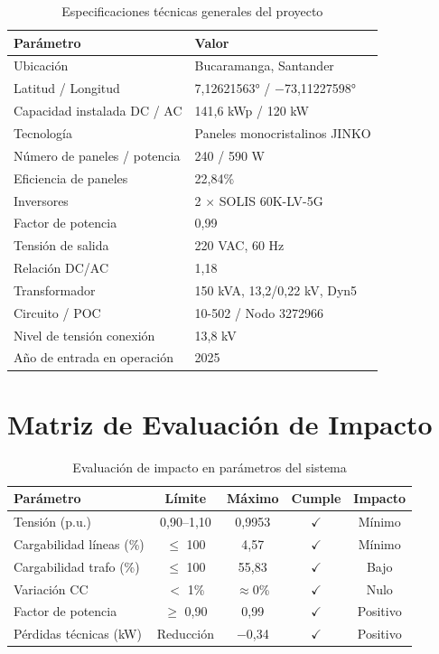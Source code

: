 \begin{table}[H]
    \centering
    \caption{Especificaciones técnicas generales del proyecto}
    \begin{tabular}{ll}
    \toprule
    \textbf{Parámetro} & \textbf{Valor} \\
    \midrule
    Ubicación & Bucaramanga, Santander \\
    Latitud / Longitud & 7,12621563° / $-$73,11227598° \\
    Capacidad instalada DC / AC & 141,6 kWp / 120 kW \\
    Tecnología & Paneles monocristalinos JINKO \\
    Número de paneles / potencia & 240 / 590 W \\
    Eficiencia de paneles & 22,84\% \\
    Inversores & 2 $\times$ SOLIS 60K-LV-5G \\
    Factor de potencia & 0,99 \\
    Tensión de salida & 220 VAC, 60 Hz \\
    Relación DC/AC & 1,18 \\
    Transformador & 150 kVA, 13,2/0,22 kV, Dyn5 \\
    Circuito / POC & 10-502 / Nodo 3272966 \\
    Nivel de tensión conexión & 13,8 kV \\
    Año de entrada en operación & 2025 \\
    \bottomrule
    \end{tabular}
\end{table}

\section{Matriz de Evaluación de Impacto}

\begin{table}[H]
    \centering
    \caption{Evaluación de impacto en parámetros del sistema}
    \begin{tabular}{lcccc}
    \toprule
    \textbf{Parámetro} & \textbf{Límite} & \textbf{Máximo} & \textbf{Cumple} & \textbf{Impacto} \\
    \midrule
    Tensión (p.u.) & 0,90--1,10 & 0,9953 & $\checkmark$ & Mínimo \\
    Cargabilidad líneas (\%) & $\leq$ 100 & 4,57 & $\checkmark$ & Mínimo \\
    Cargabilidad trafo (\%) & $\leq$ 100 & 55,83 & $\checkmark$ & Bajo \\
    Variación CC & $<$ 1\% & $\approx$0\% & $\checkmark$ & Nulo \\
    Factor de potencia & $\geq$ 0,90 & 0,99 & $\checkmark$ & Positivo \\
    Pérdidas técnicas (kW) & Reducción & $-$0,34 & $\checkmark$ & Positivo \\
    \bottomrule
    \end{tabular}
\end{table}

